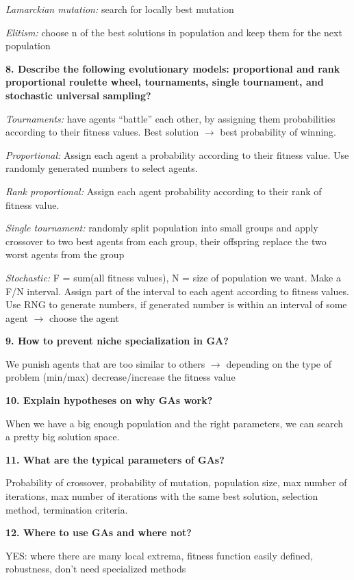 \textit{Lamarckian mutation:} search for locally best mutation

\textit{Elitism:} choose n of the best solutions in population and
keep them for the next population

\textbf{8. Describe the following evolutionary models: proportional and
rank proportional roulette wheel, tournaments, single tournament, and
stochastic universal sampling?}

\textit{Tournaments:} have agents ``battle'' each other, by assigning
them probabilities according to their fitness values. Best solution
$\rightarrow$ best probability of winning.

\textit{Proportional:} Assign each agent a probability according to
their fitness value. Use randomly generated numbers to select agents.

\textit{Rank proportional:} Assign each agent probability according
to their rank of fitness value.

\textit{Single tournament:} randomly split population into small
groups and apply crossover to two best agents from each group, their
offspring replace the two worst agents from the group

\textit{Stochastic:} F = sum(all fitness values), N = size of
population we want. Make a F/N interval. Assign part of the interval to
each agent according to fitness values. Use RNG to generate numbers, if
generated number is within an interval of some agent $\rightarrow$
choose the agent

\textbf{9. How to prevent niche specialization in GA?}

We punish agents that are too similar to others $\rightarrow$
depending on the type of problem (min/max) decrease/increase the fitness
value

\textbf{10. Explain hypotheses on why GAs work?}

When we have a big enough population and the right parameters, we can
search a pretty big solution space.

\textbf{11. What are the typical parameters of GAs?}

Probability of crossover, probability of mutation, population size, max
number of iterations, max number of iterations with the same best
solution, selection method, termination criteria.

\textbf{12. Where to use GAs and where not?}

YES: where there are many local extrema, fitness function easily
defined, robustness, don't need specialized methods

